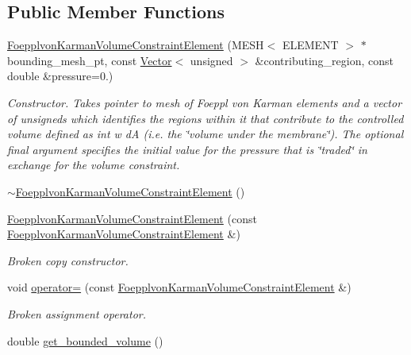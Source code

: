 \subsection*{Public Member Functions}
\begin{DoxyCompactItemize}
\item 
\hyperlink{classoomph_1_1FoepplvonKarmanVolumeConstraintElement_af470df251a724f84a330e506bf9e14c3}{Foepplvon\+Karman\+Volume\+Constraint\+Element} (M\+E\+SH$<$ E\+L\+E\+M\+E\+NT $>$ $\ast$bounding\+\_\+mesh\+\_\+pt, const \hyperlink{classoomph_1_1Vector}{Vector}$<$ unsigned $>$ \&contributing\+\_\+region, const double \&pressure=0.)
\begin{DoxyCompactList}\small\item\em Constructor. Takes pointer to mesh of Foeppl von Karman elements and a vector of unsigneds which identifies the regions within it that contribute to the controlled volume defined as int w dA (i.\+e. the \char`\"{}volume under the membrane\char`\"{}). The optional final argument specifies the initial value for the pressure that is \char`\"{}traded\char`\"{} in exchange for the volume constraint. \end{DoxyCompactList}\item 
\hyperlink{classoomph_1_1FoepplvonKarmanVolumeConstraintElement_a59878334d7186dbbe7fdaa609bb636b9}{$\sim$\+Foepplvon\+Karman\+Volume\+Constraint\+Element} ()
\item 
\hyperlink{classoomph_1_1FoepplvonKarmanVolumeConstraintElement_ad429fa00b4af95528c141a0ee95884f1}{Foepplvon\+Karman\+Volume\+Constraint\+Element} (const \hyperlink{classoomph_1_1FoepplvonKarmanVolumeConstraintElement}{Foepplvon\+Karman\+Volume\+Constraint\+Element} \&)
\begin{DoxyCompactList}\small\item\em Broken copy constructor. \end{DoxyCompactList}\item 
void \hyperlink{classoomph_1_1FoepplvonKarmanVolumeConstraintElement_ae7d433867de128ccc2f01b304b87b1b6}{operator=} (const \hyperlink{classoomph_1_1FoepplvonKarmanVolumeConstraintElement}{Foepplvon\+Karman\+Volume\+Constraint\+Element} \&)
\begin{DoxyCompactList}\small\item\em Broken assignment operator. \end{DoxyCompactList}\item 
double \hyperlink{classoomph_1_1FoepplvonKarmanVolumeConstraintElement_a0323cc351bcaf25dfc1830b78601541a}{get\+\_\+bounded\+\_\+volume} ()

\end{DoxyCompactItemize}
